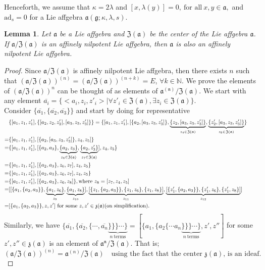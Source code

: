 \documentclass{article}
\newtheorem{lemma}[theorem]{Lemma}
\theoremstyle{definition}
\theoremstyle{remark}
\theoremstyle{plain}
\begin{document}
Henceforth, we assume that $\kappa=2\lambda$ and $[x, \lambda(y)]=0,~ \text{for all}~ x, y\in \mathfrak{a},$ and $\text{ad}_s=0$ for a Lie affgebra $\mathfrak{a}(\mathfrak{g}; \kappa, \lambda, s)$.
\begin{lemma}\label{lemma 9.2}
    Let $\mathfrak{a}$ be a Lie affgebra and $\mathfrak{Z(a)}$ be the center of the Lie affgebra $\mathfrak{a}$. If $\mathfrak{a/Z(a)}$ is an affinely nilpotent Lie affgebra, then $\mathfrak{a}$ is also an affinely nilpotent Lie affgebra.
\end{lemma}
\begin{proof}
    Since $\mathfrak{a/Z(a)}$ is affinely nilpotent Lie affgebra, then there exists $n$ such that $(\mathfrak{a/Z(a)})^{(n)}=(\mathfrak{a/Z(a)})^{(n+k)}=E$, $\forall k\in \mathbb{N}$. We prove the elements of $(\mathfrak{a/Z(a)})^{n}$ can be thought of as elements of $\mathfrak{a^{(n)}/Z(a)}.$ We start with any element $\overline{a_{i}}=\{<a_{i}, z_{i}, z'_{i}>| \forall z'_{i}\in \mathfrak{Z(a)}, \exists z_i \in \mathfrak{Z(a)}\}$.\\
    Consider $\{\overline{a_{1}},\{\overline{a_{2}},\overline{a_{3}}\}\}$ and start by doing for representative 
    \begin{align*}
    &\{[a_{1}, z_1, z'_1], \{[a_2, z_2, z'_2], [a_3, z_3,z'_3]\}\}=\{[a_{1}, z_1, z'_1],[\{a_2,[a_3, z_3, z'_3]\},\underbrace{ \{z_2, [a_3, z_3, z'_3]\}}_{z_4 \in \mathfrak{Z(a)}}, \underbrace{\{z'_2, [a_3, z_3, z_3']\}}_{z_5 \in \mathfrak{Z(a)}}\}\tag*{}\\
    =&\{[a_1, z_1, z'_1], [\{a_2, [a_3, z_3, z'_3]\}, z_4, z_5]\}\tag*{}\\
    =&\{[a_1, z_1, z'_1],[\{a_2, a_3\}, \underbrace{ \{a_2, z_3\}}_{z_6 \in \mathfrak{Z(a)}}, \underbrace{\{a_2, z'_3\}}_{z_7 \in \mathfrak{Z(a)}}], z_4, z_5\}\tag*{}\\
    =&\{[a_1, z_1, z'_1],[\{a_2, a_3\}, z_6, z_7], z_4, z_5\}\tag*{}\\
    =&\{[a_1, z_1, z'_1],[\{a_2, a_3\}, z_6, z_7], z_4, z_5\}\tag*{}\\
    =&\{[a_1, z_1, z'_1],[\{a_2, a_3\}, z_6, z_8]\}, \text{where $z_8=[z_7, z_4, z_5]$}\tag*{}\\
    =&[[\{a_1,\{a_2, a_3\}\}, \underbrace{\{a_1, z_6\}}_{z_9}, \underbrace{\{a_1, z_8\}}_{z_{10}}], \underbrace{[\{z_1, \{a_2, a_3\}\},\{z_1, z_6\}, \{z_1, z_8\}]}_{z_{11}}, \underbrace{[\{z'_1, \{a_2, a_3\}\}, \{z'_1, z_6\}, \{z'_1, z_8\}]}_{z_{12}}]\tag*{}\\
    =&[\{a_1,\{a_2, a_3\}\}, z, z'] \text{ for some $ z,z'\in \mathfrak{z(a)}$(on simplification).}\tag*{}
\end{align*} 
Similarly, we have $\{\overline{a_{1}},\{\overline{a_{2}},\{\cdots,\overline{a_{n}}\underbrace{\}\}\}\cdots\}}_{n~\text{terms}}=[\{a_{1},\{a_{2}\{\cdots a_{n}\underbrace{\}\}\}\cdots\}}_{n~\text{terms}},z',z'']$ for some $z',z''\in \mathfrak{z(a)}$ is an element of $\mathfrak{a^{n}/Z(a)}$. That is;
\begin{equation*}
(\mathfrak{a}/\mathfrak{Z(a)})^{(n)}=\mathfrak{a}^{(n)}/ \mathfrak{Z(a)} \quad \text{using the fact that the center $\mathfrak{z(a)}$, is an ideaf}.   
\end{equation*}
     

\end{proof}
\end{document}
